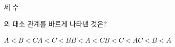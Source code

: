 세 수 \par\smallskip{}\par\smallskip\noindent 의 대소 관계를 바르게 나타낸 것은?
\begin{choices32}{$A<B<C$}{$A<C<B$}{$B<A<C$}{$B<C<A$}{$C<B<A$}\end{choices32}
